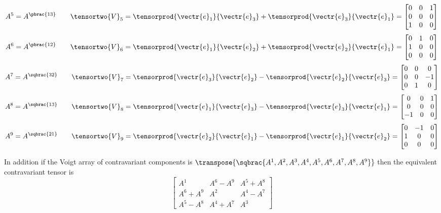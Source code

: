 \begin{equation}
  A^{5}=A^{\pbrac{13}} \qquad
  \tensortwo{V}_{5}=\tensorprod{\vectr{e}_{1}}{\vectr{e}_{3}}+\tensorprod{\vectr{e}_{3}}{\vectr{e}_{1}}=\begin{bmatrix}
  0 & 0 & 1 \\
  0 & 0 & 0 \\
  1 & 0 & 0
  \end{bmatrix}
\end{equation}
\begin{equation}
  A^{6}=A^{\pbrac{12}} \qquad
  \tensortwo{V}_{6}=\tensorprod{\vectr{e}_{1}}{\vectr{e}_{2}}+\tensorprod{\vectr{e}_{2}}{\vectr{e}_{1}}=\begin{bmatrix}
  0 & 1 & 0 \\
  1 & 0 & 0 \\
  0 & 0 & 0
  \end{bmatrix}
\end{equation}
\begin{equation}
  A^{7}=A^{\sqbrac{32}} \qquad
  \tensortwo{V}_{7}=\tensorprod{\vectr{e}_{3}}{\vectr{e}_{2}}-\tensorprod{\vectr{e}_{2}}{\vectr{e}_{3}}=\begin{bmatrix}
  0 & 0 & 0 \\
  0 & 0 & -1 \\
  0 & 1 & 0
  \end{bmatrix}
\end{equation}
\begin{equation}
  A^{8}=A^{\sqbrac{13}} \qquad
  \tensortwo{V}_{8}=\tensorprod{\vectr{e}_{1}}{\vectr{e}_{3}}-\tensorprod{\vectr{e}_{3}}{\vectr{e}_{1}}=\begin{bmatrix}
  0 & 0 & 1 \\
  0 & 0 & 0 \\
  -1 & 0 & 0
  \end{bmatrix}
\end{equation}
\begin{equation}
  A^{9}=A^{\sqbrac{21}} \qquad
  \tensortwo{V}_{9}=\tensorprod{\vectr{e}_{2}}{\vectr{e}_{1}}-\tensorprod{\vectr{e}_{1}}{\vectr{e}_{2}}=\begin{bmatrix}
  0 & -1 & 0 \\
  1 & 0 & 0 \\
  0 & 0 & 0
  \end{bmatrix}
\end{equation}

In addition if the Voigt array of contravariant components is
$\transpose{\sqbrac{A^{1},A^{2},A^{3},A^{4},A^{5},A^{6},A^{7},A^{8},A^{9}}}$
then the equivalent contravariant tensor is
\begin{equation}
  \begin{bmatrix}
    A^{1} & A^{6}-A^{9} & A^{5}+A^{8} \\
    A^{6}+A^{9} & A^{2} & A^{4}-A^{7} \\
    A^{5}-A^{8} & A^{4}+A^{7} & A^{3}
  \end{bmatrix}
\end{equation}

